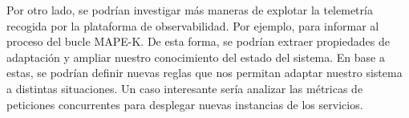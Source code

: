 Por otro lado, se podrían investigar más maneras de explotar la telemetría recogida por la plataforma de observabilidad. Por ejemplo, para informar al proceso del bucle MAPE-K. De esta forma, se podrían extraer propiedades de adaptación y ampliar nuestro conocimiento del estado del sistema. En base a estas, se podrían definir nuevas reglas que nos permitan adaptar nuestro sistema a distintas situaciones. Un caso interesante sería analizar las métricas de peticiones concurrentes para desplegar nuevas instancias de los servicios.
